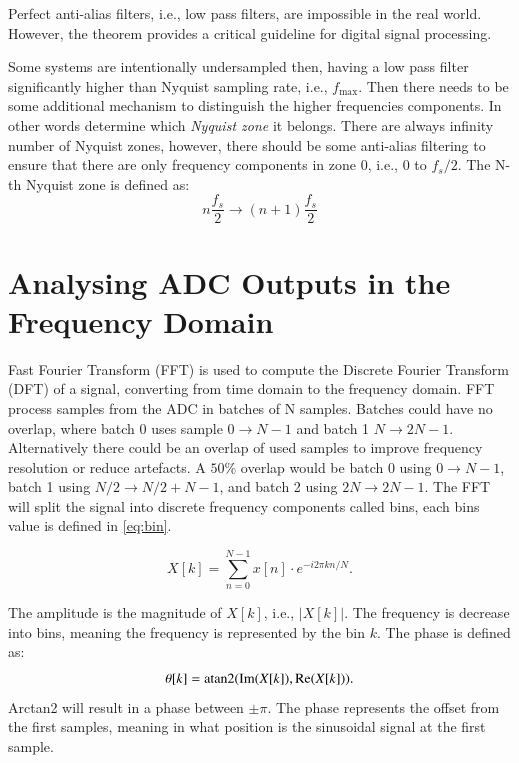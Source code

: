 Perfect anti-alias filters, i.e., low pass filters, are impossible in the real world. However, the theorem provides a critical guideline for digital signal processing. 

Some systems are intentionally undersampled then, having a low pass filter significantly higher than Nyquist sampling rate, i.e., $f_{\text{max}}$. Then there needs to be some additional mechanism to distinguish the higher frequencies components. In other words determine which \textit{Nyquist zone} it belongs. There are always infinity number of Nyquist zones, however, there should be some anti-alias filtering to ensure that there are only frequency components in zone 0, i.e., $0$ to $f_s/2$. The N-th Nyquist zone is defined as:
\begin{equation}
  n\frac{f_s}{2} \to (n+1)\frac{f_s}{2}
\end{equation}


\section{Analysing ADC Outputs in the Frequency Domain}
Fast Fourier Transform (FFT) is used to compute the Discrete Fourier Transform (DFT) of a signal, converting from time domain to the frequency domain. FFT process samples from the ADC in batches of N samples. Batches could have no overlap, where batch 0 uses sample $0\to N-1$ and batch 1 $N\to 2N-1$. Alternatively there could be an overlap of used samples to improve frequency resolution or reduce artefacts. A $50\%$ overlap would be batch 0 using $0\to N-1$, batch 1 using $N/2\to N/2+N-1$, and batch 2 using $2N\to2N-1$. The FFT will split the signal into discrete frequency components called bins, each bins value is defined in \ref{eq:bin}.

\begin{equation}\label{eq:bin}
  X[k] = \sum_{n=0}^{N-1} x[n] \cdot e^{-i2\pi kn/N}.
\end{equation}

The amplitude is the magnitude of $X[k]$, i.e., $|X[k]|$. The frequency is decrease into bins, meaning the frequency is represented by the bin $k$. The phase is defined as:
\begin{equation*}
  \theta[k]=\atan2(\Im(X[k]),\Re(X[k])).
\end{equation*}
Arctan2 will result in a phase between $\pm\pi$. The phase represents the offset from the first samples, meaning in what position is the sinusoidal signal at the first sample.

